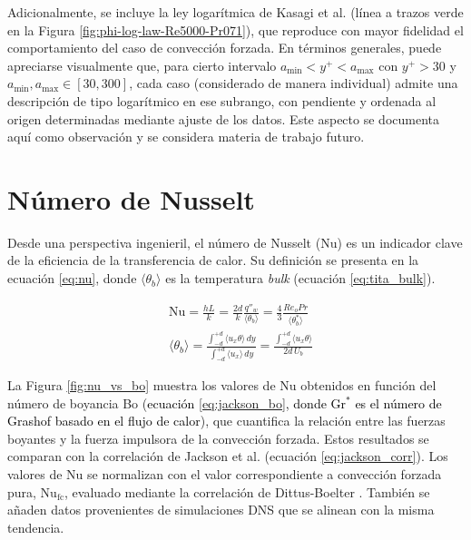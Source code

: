 Adicionalmente, se incluye la ley logarítmica de Kasagi et al. \cite{kasagi1992direct} (línea a trazos verde en la Figura \ref{fig:phi-log-law-Re5000-Pr071}), que reproduce con mayor fidelidad el comportamiento del caso de convección forzada. En términos generales, puede apreciarse visualmente que, para cierto intervalo $a_{\text{min}}<y^+<a_{\text{max}}$ con $y^+>30$ y $a_{\text{min}},a_{\text{max}}\in[30,300]$, cada caso (considerado de manera individual) admite una descripción de tipo logarítmico en ese subrango, con pendiente y ordenada al origen determinadas mediante ajuste de los datos. Este aspecto se documenta aquí como observación y se considera materia de trabajo futuro.



\newpage
\section{Número de Nusselt} \label{sec:nu}

Desde una perspectiva ingenieril, el número de Nusselt (Nu) es un indicador clave de la eficiencia de la transferencia de calor. Su definición se presenta en la ecuación \ref{eq:nu}, donde $\langle \theta_b \rangle$ es la temperatura \textit{bulk} (ecuación \ref{eq:tita_bulk}).

\begin{align}
&\text{Nu} = \frac{h L}{k} = \frac{2d}{k} \frac{q''_w}{\langle \theta_b \rangle} = \frac{4}{3} \frac{Re_o Pr}{\langle \theta^*_b \rangle}	
\label{eq:nu} \\
&\langle \theta_b \rangle = \frac{\int_{-d}^{+d} \langle u_x \theta \rangle \, dy}{\int_{-d}^{+d} \langle u_x \rangle \, dy} = \frac{\int_{-d}^{+d} \langle u_x \theta \rangle }{2d \, U_b}
\label{eq:tita_bulk}
\end{align}

La Figura \ref{fig:nu_vs_bo} muestra los valores de Nu obtenidos en función del número de boyancia Bo (\textcolor{black}{ecuación \ref{eq:jackson_bo}, donde Gr$^*$ es el número de Grashof basado en el flujo de calor}), que cuantifica la relación entre las fuerzas boyantes y la fuerza impulsora de la convección forzada. Estos resultados se comparan con la correlación de Jackson et al. \cite{jackson1989studies} (ecuación \ref{eq:jackson_corr}). Los valores de Nu se normalizan con el valor correspondiente a convección forzada pura, Nu$_{\text{fc}}$, evaluado mediante la correlación de Dittus-Boelter \cite{incropera}. También se añaden datos provenientes de simulaciones DNS \cite{you2003direct} que se alinean con la misma tendencia.

